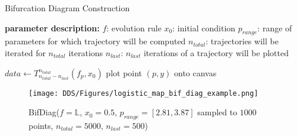 \begin{algorithm}
\caption{Bifurcation Diagram Construction}\label{bif_diag_alg}
\begin{algorithmic}[1]
\Statex \textbf{parameter description:}
\Statex $f$: evolution rule
\Statex $x_0$: initial condition
\Statex $p_{range}$: range of parameters for which trajectory will be computed
\Statex $n_{total}$: trajectories will be iterated for $n_{total}$ iterations
\Statex $n_{last}$: $n_{last}$ iterations of a trajectory will be plotted
\Statex

    \State $data \leftarrow T_{n_{total}-n_{last}}^{n_{total}}(f_p, x_0)$
        \State plot point $(p, y)$ onto canvas
    \EndFor
\EndFor
\EndFunction

\end{algorithmic}
\end{algorithm}

\begin{figure}[!h]
    \centering
    \texttt{[image: DDS/Figures/logistic\_map\_bif\_diag\_example.png]}
    \caption{BifDiag($f = \mathbb{L}$, $x_0 = 0.5$, $p_{range} = [2.81,3.87]$ sampled to $1000$ points, $n_{total} = 5000$, $n_{last} = 500$)}
    \label{fig:bif_diag_example}
\end{figure}

